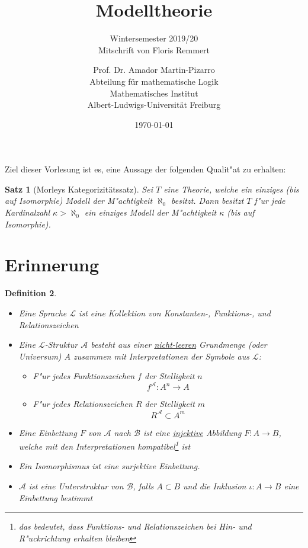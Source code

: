 \documentclass[a4paper,12pt,numbers=noenddot,parskip=full]{scrartcl}
\title{Modelltheorie}
\subtitle{Wintersemester 2019/20 \\ Mitschrift von Floris Remmert}
\author{Prof. Dr. Amador Martin-Pizarro\\Abteilung für mathematische Logik\\Mathematisches Institut\\Albert-Ludwigs-Universität Freiburg}
\date{\today}
\newcommand{\scrL}{\mathcal{L}}
\newcommand{\scrA}{\mathcal{A}}
\newcommand{\scrB}{\mathcal{B}}
\theoremstyle{dotless}
\newtheorem{theorem}{Satz}[section]
\newtheorem{definition}[theorem]{Definition}
\begin{document}
	\pagestyle{headings}
\begin{titlepage}
	\maketitle	
	\thispagestyle{empty}
\end{titlepage}
\newpage 
\thispagestyle{empty}
\quad 
\newpage
\tableofcontents 
\thispagestyle{empty}

\newpage
\setcounter{page}{1}
Ziel dieser Vorlesung ist es, eine Aussage der folgenden Qualit"at zu erhalten:
\begin{theorem}[Morleys Kategorizitätssatz]
	Sei $T$ eine Theorie, welche ein einziges (bis auf Isomorphie) Modell der M"achtigkeit $\aleph_0$ besitzt. Dann besitzt $T$ f"ur jede Kardinalzahl $\kappa > \aleph_0$ ein einziges Modell der M"achtigkeit $\kappa$ (bis auf Isomorphie).
\end{theorem}

\section{Erinnerung}
\begin{definition}
	\begin{itemize}
		\item Eine Sprache $\scrL$ ist eine Kollektion von Konstanten-, Funktions-, und Relationszeichen
		\item Eine $\scrL$-Struktur $\scrA$ besteht aus einer \underline{nicht-leeren} Grundmenge (oder Universum) $A$ zusammen mit Interpretationen der Symbole aus $\scrL$:
		\begin{itemize}
			\item F"ur jedes Funktionszeichen $f$ der Stelligkeit $n$ 
			\begin{equation*}
				f^\scrA : A^n \longrightarrow A
			\end{equation*}
			\item F"ur jedes Relationszeichen $R$ der Stelligkeit $m$
			\begin{equation*}
				R^\scrA \subset A^m
			\end{equation*}
		\end{itemize}
	\item Eine Einbettung $F$ von $\scrA$ nach $\scrB$ ist eine \underline{injektive} Abbildung $F: A \longrightarrow B$, welche mit den Interpretationen kompatibel\footnote{das bedeutet, dass Funktions- und Relationszeichen bei Hin- und R"uckrichtung erhalten bleiben} ist
	\item Ein Isomorphismus ist eine surjektive Einbettung.
	\item $\scrA$ ist eine Unterstruktur von $\scrB$, falls $A \subset B$ und die Inklusion $\iota : A \longrightarrow B$ eine Einbettung bestimmt
	\end{itemize}
\end{definition}
\end{document}
